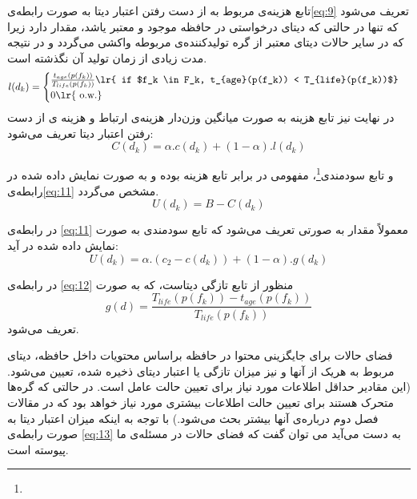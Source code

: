  تابع هزینه‌ی مربوط به از دست رفتن اعتبار دیتا به صورت رابطه‌ی\ref{eq:9} تعریف می‌شود که تنها در حالتی که دیتای درخواستی در حافظه موجود و معتبر یاشد، مقدار دارد زیرا که در سایر حالات دیتای معتبر از گره تولیدکننده‌ی مربوطه واکشی می‌گردد و در نتیجه مدت زیادی از زمان تولید آن نگذشته است. 
 \begin{equation}\label{eq:9}
 	l(d_k) = \begin{cases}
 		\frac{t_{age}(p(f_k))}{T_{life}(p(f_k))} \text{\lr{ if $f_k \in F_k, t_{age}(p(f_k)) < T_{life}(p(f_k))$}}\\
 		0 \text{\lr{ o.w.}}
 	\end{cases}
 \end{equation}  
  در نهایت نیز تابع هزینه به صورت میانگین وزن‌دار هزینه‌ی ارتباط و هزینه ی از دست رفتن اعتبار دیتا تعریف می‌شود:
  \begin{equation}\label{eq:10}
  	C(d_k) = \alpha . c(d_k) + (1 - \alpha) . l(d_k)
  \end{equation}

و تابع سودمندی\footnote{}، مفهومی در برابر تابع هزینه بوده و به صورت نمایش داده شده در رابطه‌ی\ref{eq:11} مشخص می‌گردد.
\begin{equation}\label{eq:11}
	U(d_k) = B - C(d_k)
\end{equation}

در رابطه‌ی \ref{eq:11} معمولاً مقدار  به صورتی تعریف می‌شود که تابع سودمندی به صورت نمایش داده شده در آید:
\begin{equation}\label{eq:12}
	U(d_k) = \alpha . (c_2 - c(d_k)) + (1 - \alpha) . g(d_k)
\end{equation}

در رابطه‌ی \ref{eq:12} منظور از تابع  تازگی دیتاست، که به صورت 
\begin{equation}\label{eq:13}
	g(d) = \frac{T_{life}(p(f_k)) - t_{age}(p(f_k))}{T_{life}(p(f_k))} 
\end{equation}  
تعریف می‌شود.

فضای حالات برای جایگزینی محتوا در حافظه براساس محتویات داخل حافظه، دیتای مربوط به هریک از آنها و نیز میزان تازگی یا اعتبار دیتای ذخیره شده، تعیین می‌شود. (این مقادیر حداقل اطلاعات مورد نیاز برای تعیین حالت عامل است. در حالتی که گره‌ها متحرک هستند برای تعیین حالت اطلاعات بیشتری مورد نیاز خواهد بود که در مقالات فصل دوم درباره‌ی آنها بیشتر بحث می‌شود.) با توجه به اینکه میزان اعتبار دیتا به صورت رابطه‌ی \ref{eq:13} به دست می‌آید می توان گفت که فضای حالات در مسئله‌ی ما پیوسته است. 


